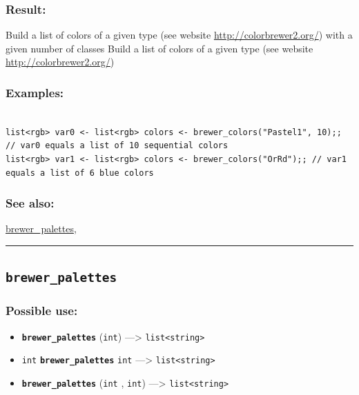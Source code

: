 \documentclass[]{book}
\providecommand{\tightlist}{%
  \setlength{\itemsep}{0pt}\setlength{\parskip}{0pt}}
\theoremstyle{definition}
\theoremstyle{definition}
\theoremstyle{definition}
\theoremstyle{remark}
\begin{document}
\subsubsection{Result:}\label{result-76}

Build a list of colors of a given type (see website
\url{http://colorbrewer2.org/}) with a given number of classes Build a
list of colors of a given type (see website
\url{http://colorbrewer2.org/})

\subsubsection{Examples:}\label{examples-59}

\begin{verbatim}
 
list<rgb> var0 <- list<rgb> colors <- brewer_colors("Pastel1", 10);; // var0 equals a list of 10 sequential colors 
list<rgb> var1 <- list<rgb> colors <- brewer_colors("OrRd");; // var1 equals a list of 6 blue colors
\end{verbatim}

\subsubsection{See also:}\label{see-also-48}

\href{operators-b-to-c.html\#brewer_palettes}{brewer\_palettes},

\begin{center}\rule{0.5\linewidth}{\linethickness}\end{center}

\subsection{\texorpdfstring{\texttt{brewer\_palettes}}{brewer\_palettes}}\label{brewer_palettes}

\subsubsection{Possible use:}\label{possible-use-78}

\begin{itemize}
\tightlist
\item
  \textbf{\texttt{brewer\_palettes}} (\texttt{int}) ---\textgreater{}
  \texttt{list\textless{}string\textgreater{}}
\item
  \texttt{int} \textbf{\texttt{brewer\_palettes}} \texttt{int}
  ---\textgreater{} \texttt{list\textless{}string\textgreater{}}
\item
  \textbf{\texttt{brewer\_palettes}} (\texttt{int} , \texttt{int})
  ---\textgreater{} \texttt{list\textless{}string\textgreater{}}
\end{itemize}
\end{document}
